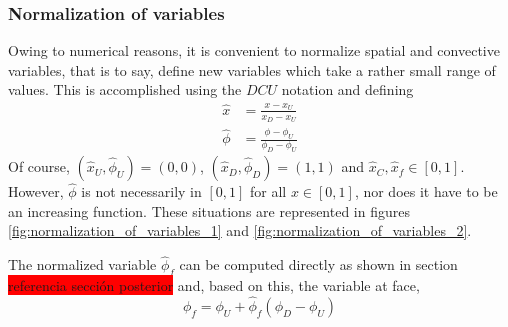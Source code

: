 \subsubsection{Normalization of variables}

Owing to numerical reasons, it is convenient to normalize spatial and convective variables, that is to say, define new variables which take a rather small range of values. This is accomplished using the $DCU$ notation and defining 
\begin{align*}
	\hat{x} &= \frac{x - x_U}{x_D - x_U} \\
	\hat{\phi} &= \frac{\phi - \phi_U}{\phi_D - \phi_U}
\end{align*}
Of course, $(\hat{x}_U, \hat{\phi}_U) = (0,0)$, $(\hat{x}_D, \hat{\phi}_D) = (1,1)$ and $\hat{x}_C, \hat{x}_f \in [0,1]$. However, $\hat{\phi}$ is not necessarily in $[0,1]$ for all $x \in [0,1]$, nor does it have to be an increasing function. These situations are represented in figures \ref{fig:normalization_of_variables_1} and \ref{fig:normalization_of_variables_2}.

The normalized variable $\hat{\phi}_f$ can be computed directly as shown in section \colorbox{red}{referencia sección posterior} and, based on this, the variable at face,
\begin{equation}
	\phi_f = \phi_U + \hat{\phi}_f (\phi_D - \phi_U)
\end{equation}

